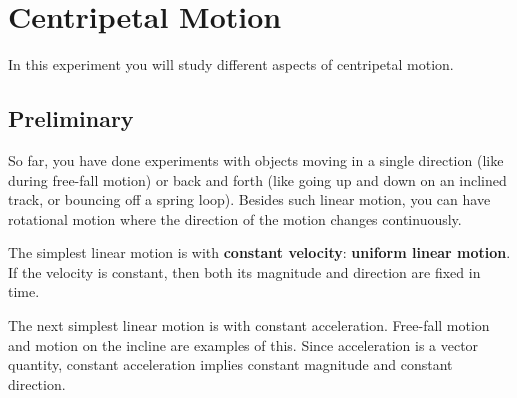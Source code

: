 \setcounter{chapter}{10}
\chapter{Centripetal Motion}
In this experiment you will study different aspects of centripetal motion.
\section{Preliminary}
So far, you have done experiments with objects moving in a single direction (like during free-fall motion) or back and forth (like going up and down on an inclined track, or bouncing off a spring loop). Besides such linear motion, you can have rotational motion where the direction of the motion changes continuously.

The simplest linear motion is with \textbf{constant velocity}: \textbf{uniform linear motion}. If the velocity is constant, then both its magnitude and direction are fixed in time.

The next simplest linear motion is with constant acceleration. Free-fall motion and motion on the incline are examples of this. Since acceleration is a vector quantity, constant acceleration implies constant magnitude and constant direction.


